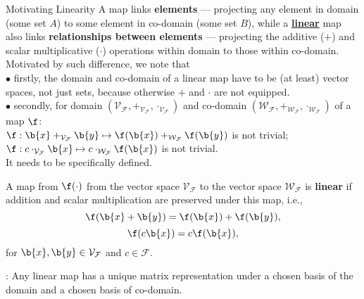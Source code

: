 \begin{textremark*}{Motivating Linearity}
A map links \textbf{elements} --- projecting any element in domain (some set $A$) to some element in co-domain (some set $B$), while a \underline{\textbf{linear}} map also links \textbf{relationships between elements} --- projecting the additive ($+$) and scalar multiplicative ($\cdot$) operations within domain to those within co-domain.\\
Motivated by such difference, we note that \\
$\bullet$ firstly, the domain and co-domain of a linear map have to be (at least) vector spaces, not just sets, because otherwise $+$ and $\cdot$ are not equipped.\\
$\bullet$ secondly, for domain $(\mathcal{V}_{\mathcal{F}}, +_{\mathcal{V}_{\mathcal{F}}}, \cdot_{\mathcal{V}_{\mathcal{F}}})$ and co-domain $(\mathcal{W}_{\mathcal{F}}, +_{\mathcal{W}_{\mathcal{F}}}, \cdot_{\mathcal{W}_{\mathcal{F}}})$ of a map $\f$:\\
$\f: \b{x} +_{\mathcal{V}_{\mathcal{F}}} \b{y} \mapsto \f(\b{x}) +_{\mathcal{W}_{\mathcal{F}}} \f(\b{y})$ is not trivial;\\
$\f: c \cdot_{\mathcal{V}_{\mathcal{F}}} \b{x} \mapsto c \cdot_{\mathcal{W}_{\mathcal{F}}} \f(\b{x})$ is not trivial.\\
It needs to be specifically defined.
\end{textremark*}

\begin{definition} 
\label{def:linear-map}
A map from $\f(\cdot)$ from the vector space $\mathcal{V}_{\mathcal{F}}$ to the vector space $\mathcal{W}_{\mathcal{F}}$ is \textbf{linear} if addition and scalar multiplication are preserved under this map, i.e., 
$$\f( \b{x} + \b{y} ) = \f(\b{x}) + \f(\b{y}),$$
$$\f(c \b{x}) = c \f(\b{x}),$$
for $\b{x}, \b{y} \in \mathcal{V}_{\mathcal{F}}$ and $c \in \mathcal{F}$. 
\end{definition}




\begin{corollary}: 
Any linear map has a unique matrix representation under a chosen basis of the domain and a chosen basis of co-domain.
\end{corollary}

